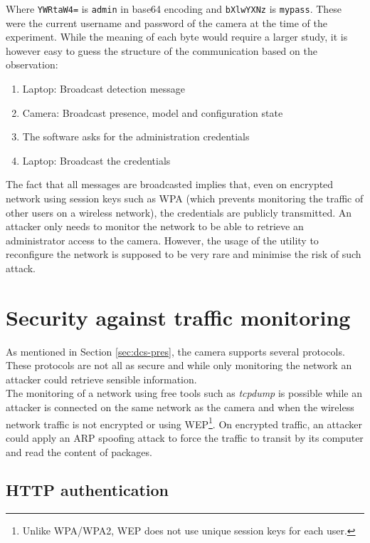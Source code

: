 Where \texttt{YWRtaW4=} is \texttt{admin} in base64 encoding and \texttt{bXlwYXNz} is \texttt{mypass}.
These were the current username and password of the camera at the time of the experiment.
While the meaning of each byte would require a larger study, it is however easy to guess the structure of the communication based on the observation:

\begin{enumerate}
\item Laptop: Broadcast detection message
\item Camera: Broadcast presence, model and configuration state
\item The software asks for the administration credentials
\item Laptop: Broadcast the credentials
\end{enumerate}

The fact that all messages are broadcasted implies that, even on encrypted network using session keys such as WPA (which prevents monitoring the traffic of other users on a wireless network), the credentials are publicly transmitted.
An attacker only needs to monitor the network to be able to retrieve an administrator access to the camera.
However, the usage of the utility to reconfigure the network is supposed to be very rare and minimise the risk of such attack.

\section{Security against traffic monitoring}
\label{sec:dcs-proto}

As mentioned in Section \ref{sec:dcs-pres}, the camera supports several protocols.
These protocols are not all as secure and while only monitoring the network an attacker could retrieve sensible information.\\

The monitoring of a network using free tools such as \emph{tcpdump} is possible while an attacker is connected on the same network as the camera and when the wireless network traffic is not encrypted or using WEP\footnote{Unlike WPA/WPA2, WEP does not use unique session keys for each user.}.
On encrypted traffic, an attacker could apply an ARP spoofing attack to force the traffic to transit by its computer and read the content of packages.

\subsection{HTTP authentication}

